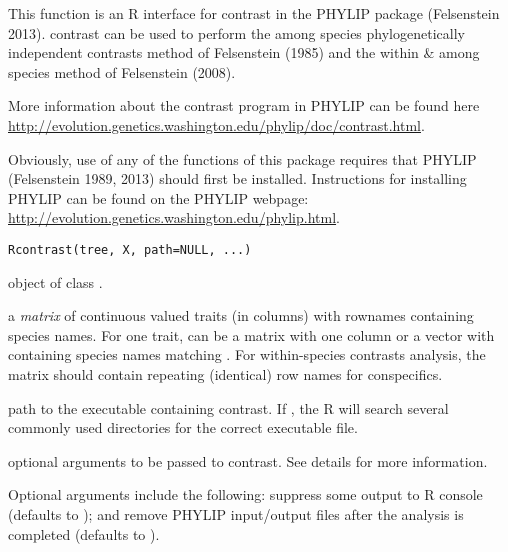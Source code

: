\documentclass[a4paper]{book}
\begin{document}
%
\begin{Description}\relax
This function is an R interface for contrast in the PHYLIP package (Felsenstein 2013). contrast can be used to perform the among species phylogenetically independent contrasts method of Felsenstein (1985) and the within \& among species method of Felsenstein (2008).

More information about the contrast program in PHYLIP can be found here \url{http://evolution.genetics.washington.edu/phylip/doc/contrast.html}.

Obviously, use of any of the functions of this package requires that PHYLIP (Felsenstein 1989, 2013) should first be installed. Instructions for installing PHYLIP can be found on the PHYLIP webpage: \url{http://evolution.genetics.washington.edu/phylip.html}.
\end{Description}
%
\begin{Usage}
\begin{verbatim}
Rcontrast(tree, X, path=NULL, ...)
\end{verbatim}
\end{Usage}
%
\begin{Arguments}
\begin{ldescription}
\item[\code{tree}] object of class .
\item[\code{X}] a \emph{matrix} of continuous valued traits (in columns) with rownames containing species names. For one trait,  can be a matrix with one column or a vector with  containing species names matching . For within-species contrasts analysis, the matrix should contain repeating (identical) row names for conspecifics.
\item[\code{path}] path to the executable containing contrast. If , the R will search several commonly used directories for the correct executable file.
\item[\code{...}] optional arguments to be passed to contrast. See details for more information.
\end{ldescription}
\end{Arguments}
%
\begin{Details}\relax
Optional arguments include the following:  suppress some output to R console (defaults to ); and  remove PHYLIP input/output files after the analysis is completed (defaults to ).
\end{Details}
\end{document}
